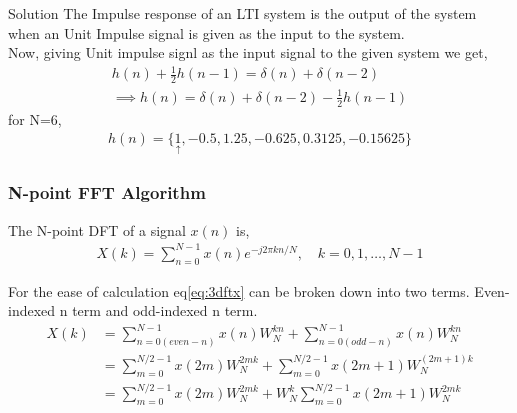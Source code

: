 \documentclass{beamer}
\begin{document}
\begin{frame}{Solution}
The Impulse response of an LTI system is the output of the system
when an Unit Impulse signal is given as the input to the system.\\
Now, giving Unit impulse signl as the input signal to the given system we get,
\begin{align}
    h(n) + \frac{1}{2}h(n-1) = \delta(n) + \delta(n-2)	
    \\
    \implies h(n) = \delta(n) + \delta(n-2) - \frac{1}{2}h(n-1) \label{eq:hn}
\end{align}
for N=6,
\begin{align}
     h(n) = \{{\underset{\uparrow}{1},-0.5,1.25,-0.625,0.3125,-0.15625}\}
\end{align}

\end{frame}
\begin{frame}
\frametitle{N-point FFT Algorithm}
The N-point DFT of a signal $x(n)$ is,
\begin{align}
    X(k) = \sum_{n=0}^{N-1}x(n)e^{-j2\pi kn/N},
    \quad k=0,1, \ldots, N-1 \label{eq:3dftx}
\end{align}

For the ease of calculation eq\eqref{eq:3dftx} can be broken down into two terms.
Even-indexed n term and odd-indexed n term.
\begin{align}
    X(k) &= \sum_{n=0(even-n)}^{N-1} x(n)W^{kn}_{N} + \sum_{n=0(odd-n)}^{N-1} x(n)W^{kn}_{N} \\
    &= \sum_{m=0}^{N/2 -1} x(2m)W^{2mk}_{N} + \sum_{m=0}^{N/2 -1} x(2m+1)W^{(2m+1)k}_{N} \\
    &= \sum_{m=0}^{N/2 -1} x(2m)W^{2mk}_{N} + W^{k}_{N} \sum_{m=0}^{N/2 -1} x(2m+1)W^{2mk}_{N} \label{eq:3.1.5}
\end{align}
\end{frame}
\end{document}
